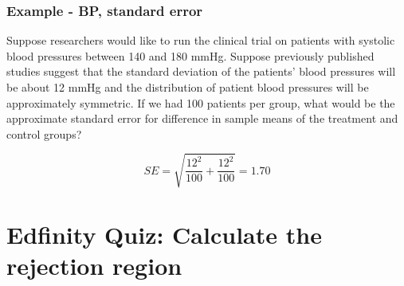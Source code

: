 \documentclass[slidestop,compress,mathserif]{beamer}
\newcommand{\soln}[1]{\textit{#1}}
\begin{document}

\begin{frame}
\frametitle{Example - BP, standard error}

{\dq
{\footnotesize
Suppose researchers would like to run the clinical trial on patients with systolic blood pressures between 140 and 180 mmHg. Suppose previously published studies suggest that the standard deviation of the patients' blood pressures will be about 12 mmHg and the distribution of patient blood pressures will be approximately symmetric. If we had 100 patients per group, what would be the approximate standard error for difference in sample means of the treatment and control groups?
}
}

\pause

\soln{
\[ SE = \sqrt{ \frac{12^2}{100} + \frac{12^2}{100} } = 1.70 \]
}

\end{frame}


\section{Edfinity Quiz: Calculate the rejection region}

\end{document}

